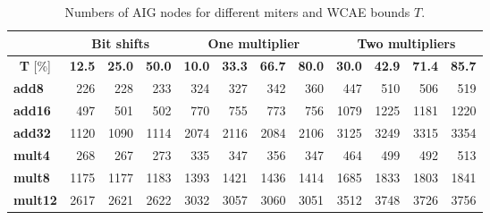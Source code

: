 \documentclass[runningheads]{llncs}
\begin{document}
\begin{table}[t]

\centering
\renewcommand{\arraystretch}{1.08}
\caption{Numbers of AIG nodes for different miters and WCAE bounds $T$.}
\label{tab:miter-params}
\begin{tabular*}{\textwidth}{@{\extracolsep{\fill}}l|rrr|rrrr|rrrr}
\multicolumn{1}{c|}{} & \multicolumn{3}{c|}{\textbf{Bit shifts}} & \multicolumn{4}{c|}{\textbf{One multiplier}} & \multicolumn{4}{c}{\textbf{Two multipliers}} \\ \hline
\multicolumn{1}{c|}{\textbf{T} [\%]} & \multicolumn{1}{c}{\textbf{12.5}} & \multicolumn{1}{c}{\textbf{25.0}} & \multicolumn{1}{c|}{\textbf{50.0}} & \multicolumn{1}{c}{\textbf{10.0}} & \multicolumn{1}{c}{\textbf{33.3}} & \multicolumn{1}{c}{\textbf{66.7}} & \multicolumn{1}{c|}{\textbf{80.0}} & \multicolumn{1}{c}{\textbf{30.0}} & \multicolumn{1}{c}{\textbf{42.9}} & \multicolumn{1}{c}{\textbf{71.4}} & \multicolumn{1}{c}{\textbf{85.7}} \\ \hline
\textbf{add8} & 226 & 228 & 233 & 324 & 327 & 342 & 360 & 447 & 510 & 506 & 519 \\
\textbf{add16} & 497 & 501 & 502 & 770 & 755 & 773 & 756 & 1079 & 1225 & 1181 & 1220 \\
\textbf{add32} & 1120 & 1090 & 1114 & 2074 & 2116 & 2084 & 2106 & 3125 & 3249 & 3315 & 3354 \\ \hline
\textbf{mult4} & 268 & 267 & 273 & 335 & 347 & 356 & 347 & 464 & 499 & 492 & 513 \\
\textbf{mult8} & 1175 & 1177 & 1183 & 1393 & 1421 & 1436 & 1414 & 1685 & 1833 & 1803 & 1841 \\
\textbf{mult12} & 2617 & 2621 & 2622 & 3032 & 3057 & 3060 & 3051 & 3512 & 3748 & 3726 & 3756
\end{tabular*}
\end{table}
\end{document}
